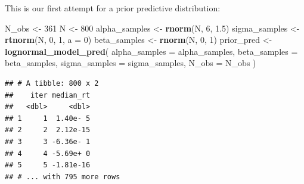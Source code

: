 \documentclass[12pt,ignorenonframetext,aspectratio=169]{beamer}
\newenvironment{Shaded}{\begin{snugshade}}{\end{snugshade}}
\newcommand{\DataTypeTok}[1]{\textcolor[rgb]{0.13,0.29,0.53}{#1}}
\newcommand{\DecValTok}[1]{\textcolor[rgb]{0.00,0.00,0.81}{#1}}
\newcommand{\FloatTok}[1]{\textcolor[rgb]{0.00,0.00,0.81}{#1}}
\newcommand{\KeywordTok}[1]{\textcolor[rgb]{0.13,0.29,0.53}{\textbf{#1}}}
\newcommand{\NormalTok}[1]{#1}
\newcommand{\OperatorTok}[1]{\textcolor[rgb]{0.81,0.36,0.00}{\textbf{#1}}}
\newcommand{\OtherTok}[1]{\textcolor[rgb]{0.56,0.35,0.01}{#1}}
\newcommand{\StringTok}[1]{\textcolor[rgb]{0.31,0.60,0.02}{#1}}
\begin{document}
\begin{frame}[fragile]

This is our first attempt for a prior predictive distribution:

\scriptsize

\begin{Shaded}
\begin{Highlighting}[]
\NormalTok{N_obs <-}\StringTok{ }\DecValTok{361}
\NormalTok{N <-}\StringTok{ }\DecValTok{800}
\NormalTok{alpha_samples <-}\StringTok{ }\KeywordTok{rnorm}\NormalTok{(N, }\DecValTok{6}\NormalTok{, }\FloatTok{1.5}\NormalTok{)}
\NormalTok{sigma_samples <-}\StringTok{ }\KeywordTok{rtnorm}\NormalTok{(N, }\DecValTok{0}\NormalTok{, }\DecValTok{1}\NormalTok{, }\DataTypeTok{a =} \DecValTok{0}\NormalTok{)}
\NormalTok{beta_samples <-}\StringTok{ }\KeywordTok{rnorm}\NormalTok{(N, }\DecValTok{0}\NormalTok{, }\DecValTok{1}\NormalTok{)}
\NormalTok{prior_pred <-}\StringTok{ }\KeywordTok{lognormal_model_pred}\NormalTok{(}
  \DataTypeTok{alpha_samples =}\NormalTok{ alpha_samples,}
  \DataTypeTok{beta_samples =}\NormalTok{ beta_samples,}
  \DataTypeTok{sigma_samples =}\NormalTok{ sigma_samples,}
  \DataTypeTok{N_obs =}\NormalTok{ N_obs}
\NormalTok{)}
\end{Highlighting}
\end{Shaded}

\normalsize

\end{frame}

\begin{frame}[fragile]

\scriptsize

\begin{Shaded}
\end{Shaded}

\begin{verbatim}
## # A tibble: 800 x 2
##    iter median_rt
##   <dbl>     <dbl>
## 1     1  1.40e- 5
## 2     2  2.12e-15
## 3     3 -6.36e- 1
## 4     4 -5.69e+ 0
## 5     5 -1.81e-16
## # ... with 795 more rows
\end{verbatim}

\normalsize

\end{frame}
\end{document}

